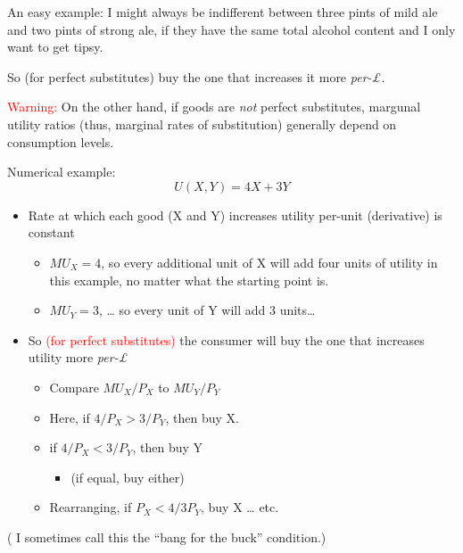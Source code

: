 \documentclass[]{article}
\providecommand{\tightlist}{%
  \setlength{\itemsep}{0pt}\setlength{\parskip}{0pt}}
\begin{document}
An easy example: I might always be indifferent between three pints of
mild ale and two pints of strong ale, if they have the same total
alcohol content and I only want to get tipsy.

So (for perfect substitutes) buy the one that increases it more
\emph{per-\pounds.}

\textcolor{red}{Warning:} On the other hand, if goods are \emph{not}
perfect substitutes, margunal utility ratios (thus, marginal rates of
substitution) generally depend on consumption levels.

\bigskip

Numerical example:\\

\[U(X,Y)=4X+3Y\]

\begin{itemize}
\tightlist
\item
  Rate at which each good (X and Y) increases utility per-unit
  (derivative) is constant

  \begin{itemize}
  \tightlist
  \item
    \(MU_X = 4\), so every additional unit of X will add four units of
    utility in this example, no matter what the starting point is.
  \item
    \(MU_Y = 3\), \ldots{} so every unit of Y will add 3 units\ldots{}
  \end{itemize}
\item
  So \textcolor{red}{(for perfect substitutes)} the consumer will buy
  the one that increases utility more \emph{per-£}

  \begin{itemize}
  \tightlist
  \item
    Compare \(MU_X/P_X\) to \(MU_Y/P_Y\)
  \item
    Here, if \(4/P_X > 3/P_Y\), then buy X.
  \item
    if \(4/P_X < 3/P_Y\), then buy Y

    \begin{itemize}
    \tightlist
    \item
      (if equal, buy either)
    \end{itemize}
  \item
    Rearranging, if \(P_X < 4/3 P_Y\), buy X \ldots{} etc.
  \end{itemize}
\end{itemize}

( I sometimes call this the ``bang for the buck'' condition.)
\end{document}

